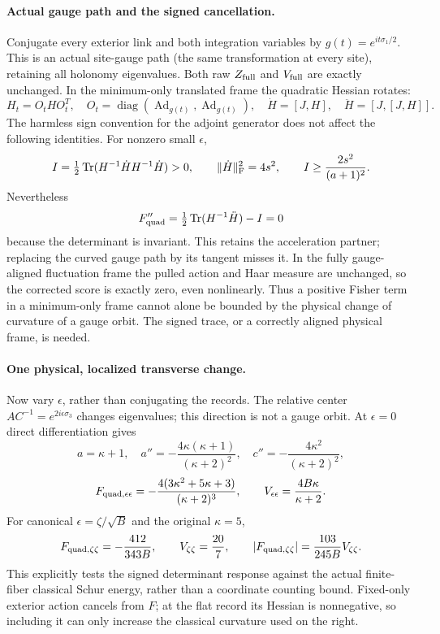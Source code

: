 \documentclass[11pt]{article}
\begin{document}
\paragraph{Actual gauge path and the signed cancellation.}
Conjugate every exterior link and both integration variables by
$g(t)=e^{it\sigma_1/2}$. This is an actual site-gauge path (the same
transformation at every site), retaining all holonomy eigenvalues.
Both raw $Z_{\rm full}$ and $V_{\rm full}$ are exactly unchanged.
In the minimum-only translated frame the quadratic Hessian rotates:
\[
 H_t=O_t H O_t^T,\quad O_t=\operatorname{diag}(\operatorname{Ad}_{g(t)},
 \operatorname{Ad}_{g(t)}),\quad
 \dot H=[J,H],\quad \ddot H=[J,[J,H]] .
\]
The harmless sign convention for the adjoint generator does not affect
the following identities. For nonzero small $\epsilon$,
\[
 I=\tfrac12\operatorname{Tr}(H^{-1}\dot H H^{-1}\dot H)>0,\qquad
 \|\dot H\|_{\rm F}^2=4s^2,\qquad I\ge\frac{2s^2}{(a+1)^2}.
\]
Nevertheless
\[
 F_{\rm quad}''=
 \tfrac12\operatorname{Tr}(H^{-1}\ddot H)-I=0
\]
because the determinant is invariant. This retains the acceleration
partner; replacing the curved gauge path by its tangent misses it.
In the fully gauge-aligned fluctuation frame the pulled action and Haar
measure are unchanged, so the corrected score is exactly zero,
even nonlinearly. Thus a positive Fisher term in a minimum-only frame
cannot alone be bounded by the physical change of curvature of a gauge
orbit. The signed trace, or a correctly aligned physical frame, is needed.

\paragraph{One physical, localized transverse change.}
Now vary $\epsilon$, rather than conjugating the records.
The relative center $AC^{-1}=e^{2i\epsilon\sigma_3}$ changes eigenvalues;
this direction is not a gauge orbit. At $\epsilon=0$ direct differentiation
gives
\[
 a=\kappa+1,\quad
 a''=-\frac{4\kappa(\kappa+1)}{(\kappa+2)^2},\quad
 c''=-\frac{4\kappa^2}{(\kappa+2)^2},
\]
\[
 F_{\rm quad,\epsilon\epsilon}
 =-\frac{4(3\kappa^2+5\kappa+3)}{(\kappa+2)^3},\qquad
 V_{\epsilon\epsilon}=\frac{4B\kappa}{\kappa+2}.
\]
For canonical $\epsilon=\zeta/\sqrt B$ and the original $\kappa=5$,
\[
 F_{\rm quad,\zeta\zeta}=-\frac{412}{343B},\qquad
 V_{\zeta\zeta}=\frac{20}{7},\qquad
 |F_{\rm quad,\zeta\zeta}|=\frac{103}{245B}V_{\zeta\zeta}.
\]
This explicitly tests the signed determinant response against the actual
finite-fiber classical Schur energy, rather than a coordinate counting
bound. Fixed-only exterior action cancels from $F$; at the flat record
its Hessian is nonnegative, so including it can only increase the
classical curvature used on the right.
\end{document}
